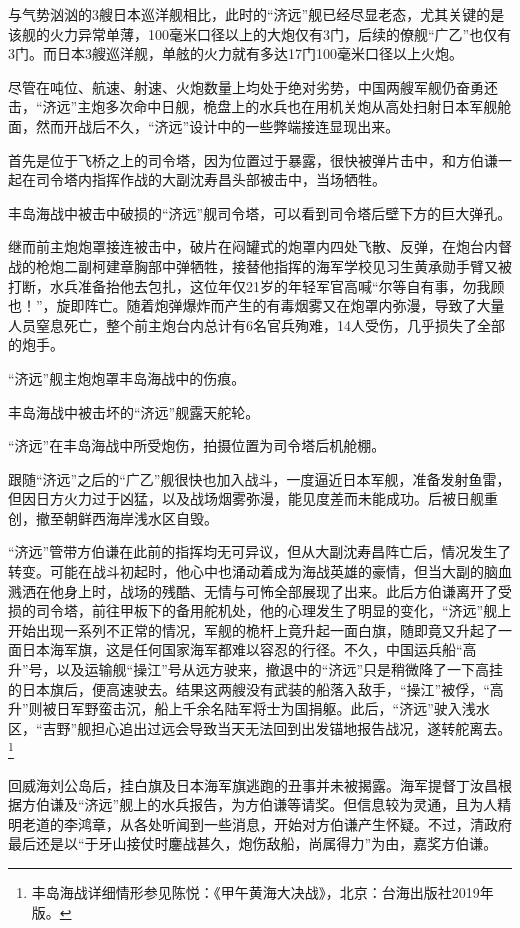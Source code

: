 \documentclass[12pt,UTF8]{ctexbook}
\begin{document}
与气势汹汹的3艘日本巡洋舰相比，此时的“济远”舰已经尽显老态，尤其关键的是该舰的火力异常单薄，100毫米口径以上的大炮仅有3门，后续的僚舰“广乙”也仅有3门。而日本3艘巡洋舰，单舷的火力就有多达17门100毫米口径以上火炮。

尽管在吨位、航速、射速、火炮数量上均处于绝对劣势，中国两艘军舰仍奋勇还击，“济远”主炮多次命中日舰，桅盘上的水兵也在用机关炮从高处扫射日本军舰舱面，然而开战后不久，“济远”设计中的一些弊端接连显现出来。

首先是位于飞桥之上的司令塔，因为位置过于暴露，很快被弹片击中，和方伯谦一起在司令塔内指挥作战的大副沈寿昌头部被击中，当场牺牲。

丰岛海战中被击中破损的“济远”舰司令塔，可以看到司令塔后壁下方的巨大弹孔。

继而前主炮炮罩接连被击中，破片在闷罐式的炮罩内四处飞散、反弹，在炮台内督战的枪炮二副柯建章胸部中弹牺牲，接替他指挥的海军学校见习生黄承勋手臂又被打断，水兵准备抬他去包扎，这位年仅21岁的年轻军官高喊“尔等自有事，勿我顾也！”，旋即阵亡。随着炮弹爆炸而产生的有毒烟雾又在炮罩内弥漫，导致了大量人员窒息死亡，整个前主炮台内总计有6名官兵殉难，14人受伤，几乎损失了全部的炮手。

“济远”舰主炮炮罩丰岛海战中的伤痕。

丰岛海战中被击坏的“济远”舰露天舵轮。

“济远”在丰岛海战中所受炮伤，拍摄位置为司令塔后机舱棚。

跟随“济远”之后的“广乙”舰很快也加入战斗，一度逼近日本军舰，准备发射鱼雷，但因日方火力过于凶猛，以及战场烟雾弥漫，能见度差而未能成功。后被日舰重创，撤至朝鲜西海岸浅水区自毁。

“济远”管带方伯谦在此前的指挥均无可异议，但从大副沈寿昌阵亡后，情况发生了转变。可能在战斗初起时，他心中也涌动着成为海战英雄的豪情，但当大副的脑血溅洒在他身上时，战场的残酷、无情与可怖全部展现了出来。此后方伯谦离开了受损的司令塔，前往甲板下的备用舵机处，他的心理发生了明显的变化，“济远”舰上开始出现一系列不正常的情况，军舰的桅杆上竟升起一面白旗，随即竟又升起了一面日本海军旗，这是任何国家海军都难以容忍的行径。不久，中国运兵船“高升”号，以及运输舰“操江”号从远方驶来，撤退中的“济远”只是稍微降了一下高挂的日本旗后，便高速驶去。结果这两艘没有武装的船落入敌手，“操江”被俘，“高升”则被日军野蛮击沉，船上千余名陆军将士为国捐躯。此后，“济远”驶入浅水区，“吉野”舰担心追出过远会导致当天无法回到出发锚地报告战况，遂转舵离去。\footnote{丰岛海战详细情形参见陈悦：《甲午黄海大决战》，北京：台海出版社2019年版。}

回威海刘公岛后，挂白旗及日本海军旗逃跑的丑事并未被揭露。海军提督丁汝昌根据方伯谦及“济远”舰上的水兵报告，为方伯谦等请奖。但信息较为灵通，且为人精明老道的李鸿章，从各处听闻到一些消息，开始对方伯谦产生怀疑。不过，清政府最后还是以“于牙山接仗时鏖战甚久，炮伤敌船，尚属得力”为由，嘉奖方伯谦。
\end{document}
